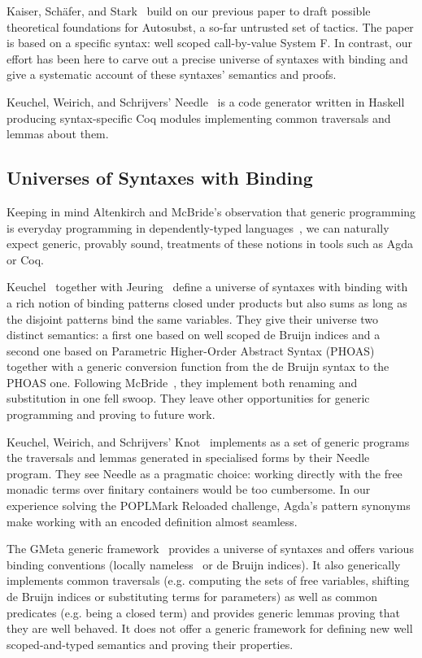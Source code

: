 Kaiser, Schäfer, and Stark~\citeyear{Kaiser-wsdebr} build on our previous paper
to draft possible theoretical foundations for Autosubst, a so-far untrusted
set of tactics. The paper is based on a specific syntax: well scoped call-by-value
System F. In contrast, our effort has been here to carve out
a precise universe of syntaxes with binding and give a systematic account
of these syntaxes' semantics and proofs.

Keuchel, Weirich, and Schrijvers' Needle~\citeyear{needleandknot} is a code
generator written in Haskell producing syntax-specific Coq modules
implementing common traversals and lemmas about them.

\subsection{Universes of Syntaxes with Binding} Keeping in mind Altenkirch
and McBride's observation that generic programming is everyday programming
in dependently-typed languages~\citeyear{DBLP:conf/ifip2-1/AltenkirchM02}, we can naturally
expect generic, provably sound, treatments of these notions in tools such as
Agda or Coq.

Keuchel~\citeyear{Keuchel:Thesis:2011} together with Jeuring~\citeyear{DBLP:conf/icfp/KeuchelJ12}
define a universe of syntaxes with binding with a rich notion of binding patterns
closed under products but also sums as long as the disjoint patterns bind the same
variables. They give their universe two distinct semantics: a first one based on well
scoped de Bruijn indices and a second one based on Parametric Higher-Order Abstract
Syntax (PHOAS)~\cite{DBLP:conf/icfp/Chlipala08} together with a generic conversion
function from the de Bruijn syntax to the PHOAS one. Following McBride~\citeyear{mcbride2005type},
they implement both renaming and substitution in one fell swoop. They leave other
opportunities for generic programming and proving to future work.

Keuchel, Weirich, and Schrijvers' Knot~\citeyear{needleandknot} implements
as a set of generic programs the traversals and lemmas generated in specialised
forms by their Needle program. They see Needle as a pragmatic choice: working
directly with the free monadic terms over finitary containers would be too cumbersome. In
our experience solving the POPLMark Reloaded challenge, Agda's pattern
synonyms make working with an encoded definition almost
seamless.

The GMeta generic framework~\citeyear{gmeta} provides a universe of syntaxes
and offers various binding conventions (locally nameless~\cite{Chargueraud2012}
or de Bruijn indices). It also generically implements common traversals (e.g. computing
the sets of free variables,
shifting
de Bruijn indices or substituting terms for parameters) as well as common
predicates (e.g. being a closed term) and provides generic lemmas proving that
they are well behaved. It does not offer a generic framework
for defining new well scoped-and-typed semantics and proving their properties.

